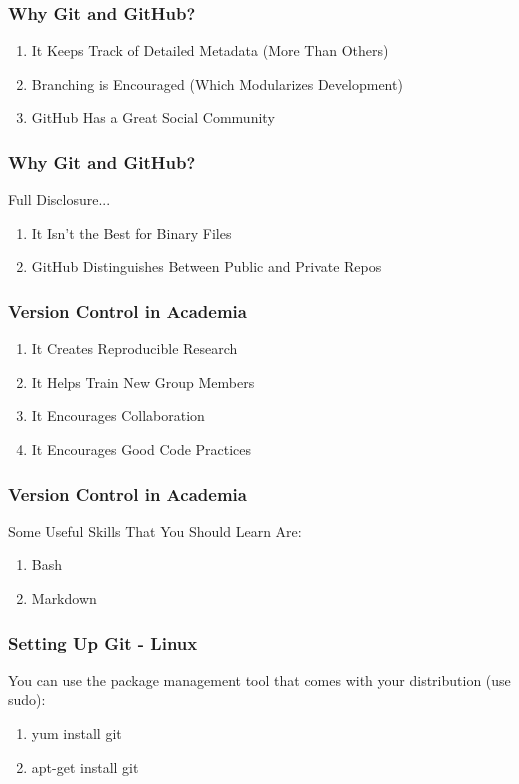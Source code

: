 \begin{frame}
\frametitle{\large{Why Git and GitHub?}}
\begin{enumerate}
\item It Keeps Track of Detailed Metadata (More Than Others)
\item Branching is Encouraged (Which Modularizes Development)
\item GitHub Has a Great Social Community
\end{enumerate}
\end{frame}

\begin{frame}
\frametitle{\large{Why Git and GitHub?}}
Full Disclosure...
\begin{enumerate}
\item It Isn't the Best for Binary Files
\item GitHub Distinguishes Between Public and Private Repos
\end{enumerate}
\end{frame}


\begin{frame}
\frametitle{\large{Version Control in Academia}}
\begin{enumerate}
\item It Creates Reproducible Research
\item It Helps Train New Group Members
\item It Encourages Collaboration
\item It Encourages Good Code Practices
\end{enumerate}
\end{frame}

\begin{frame}
\frametitle{\large{Version Control in Academia}}
Some Useful Skills That You Should Learn Are:
\begin{enumerate}
\item Bash
\item Markdown
\end{enumerate}
\end{frame}


\begin{frame}
\frametitle{\large{Setting Up Git - Linux}}
You can use the package management tool that comes with your distribution (use sudo):
\begin{enumerate}
\item yum install git
\item apt-get install git
\end{enumerate}
\end{frame}

